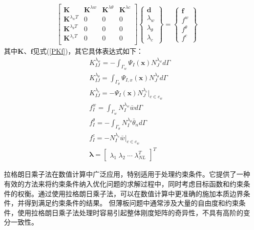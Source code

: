 \begin{equation}
    \begin{split}
     \left[\begin{matrix}\pmb{K}&\pmb{K}^{\lambda w}&\pmb{K}^{\lambda\theta}&\pmb{K}^{\lambda c}\\
     \pmb{K}^{\lambda_wT}&0&0&0\\
     \pmb{K}^{\lambda_\theta T}&0&0&0\\
     \pmb{K}^{\lambda_c T}&0&0&0\\
     \end{matrix}\right]
     \left\{\begin{matrix}
     \pmb{d}\\\lambda_w\\\lambda_{\theta}\\\lambda_c
     \end{matrix}\right\}=
     \left\{\begin{matrix}
     \pmb{f}\\f^w\\f^{\theta}\\f^c
     \end{matrix}\right\}
\end{split}
\end{equation}
其中$\pmb{K}$、$\pmb{f}$见式(\ref{PKf})，其它具体表达式如下：
\begin{subequations}
    \begin{align}
    &K_{I\!J}^{\lambda_w}=-\int_{\Gamma_w}\Psi_I(\pmb{x})N_J^{\lambda_w}d\Gamma\\
    &K_{I\!J}^{\lambda_\theta}=\int_{\Gamma_\theta}\Psi_{I,x}(\pmb{x})N_J^{\lambda_\theta}d\Gamma\\
    &K_{I\!J}^{\lambda_c}=-\Psi_I(\pmb{x})N_J^{\lambda_c}\vert_{c\in c_w}\\
    &f_I^w=\int_{\Gamma_w}N_I^{\lambda_w}\bar{w}d\Gamma\\
    &f_I^\theta=-\int_{\Gamma_\theta}N_I^{\lambda_\theta}\bar{\theta}_nd\Gamma\\
    &f_I^c=-N_I^{\lambda_c}\bar{w}\vert_{c\in c_w}\\
    &\pmb{\lambda}=\left[\begin{matrix}\lambda_1\;\lambda_2\;\dotsb\;\lambda_{N\!L}^T\end{matrix}\right]^T
   \end{align}
\end{subequations}\par
拉格朗日乘子法在数值计算中广泛应用，特别适用于处理约束条件。它提供了一种有效的方法来将约束条件纳入优化问题的求解过程中，同时考虑目标函数和约束条件的权衡。通过使用拉格朗日乘子法，可以在数值计算中更准确的施加本质边界条件，并得到满足约束条件的结果。
但薄板问题中通常涉及大量的自由度和约束条件，使用拉格朗日乘子法处理时容易引起整体刚度矩阵的奇异性，不具有高阶的变分一致性。
